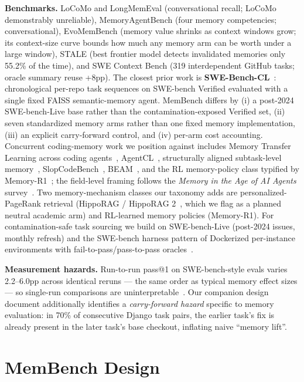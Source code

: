 \documentclass[11pt]{article}
\begin{document}
\textbf{Benchmarks.} LoCoMo and LongMemEval (conversational recall; LoCoMo demonstrably unreliable), MemoryAgentBench (four memory competencies; conversational), EvoMemBench (memory value shrinks as context windows grow; its context-size curve bounds how much any memory arm can be worth under a large window), STALE (best frontier model detects invalidated memories only 55.2\% of the time), and SWE Context Bench (319 interdependent GitHub tasks; oracle summary reuse +8pp). The closest prior work is \textbf{SWE-Bench-CL}~\cite{swebenchcl}: chronological per-repo task sequences on SWE-bench Verified evaluated with a single fixed FAISS semantic-memory agent. MemBench differs by (i) a post-2024 SWE-bench-Live base rather than the contamination-exposed Verified set, (ii) seven standardized memory arms rather than one fixed memory implementation, (iii) an explicit carry-forward control, and (iv) per-arm cost accounting. Concurrent coding-memory work we position against includes Memory Transfer Learning across coding agents~\cite{memtransfer}, AgentCL~\cite{agentcl}, structurally aligned subtask-level memory~\cite{subtaskmem}, SlopCodeBench~\cite{slopcode}, BEAM~\cite{beam}, and the RL memory-policy class typified by Memory-R1~\cite{memoryr1}; the field-level framing follows the \emph{Memory in the Age of AI Agents} survey~\cite{memsurvey}. Two memory-mechanism classes our taxonomy adds are personalized-PageRank retrieval (HippoRAG / HippoRAG 2~\cite{hipporag,hipporag2}, which we flag as a planned neutral academic arm) and RL-learned memory policies (Memory-R1). For contamination-safe task sourcing we build on SWE-bench-Live (post-2024 issues, monthly refresh) and the SWE-bench harness pattern of Dockerized per-instance environments with fail-to-pass/pass-to-pass oracles~\cite{swebench-live}.

\textbf{Measurement hazards.} Run-to-run pass@1 on SWE-bench-style evals varies 2.2--6.0pp across identical reruns --- the same order as typical memory effect sizes --- so single-run comparisons are uninterpretable~\cite{errorbars}. Our companion design document additionally identifies a \emph{carry-forward hazard} specific to memory evaluation: in 70\% of consecutive Django task pairs, the earlier task's fix is already present in the later task's base checkout, inflating naive ``memory lift''.

\section{MemBench Design}
\end{document}
